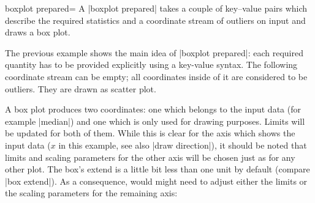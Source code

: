 \begin{plottype}[/pgfplots]{boxplot prepared=\textcolor{black}{\normalfont{}}}
	A |boxplot prepared| takes a couple of key--value pairs which describe the required statistics and a coordinate stream of outliers on input and draws a box plot.

\begin{codeexample}[]
\end{codeexample}
	\noindent The previous example shows the main idea of |boxplot prepared|: each required quantity has to be provided explicitly using a key-value syntax. The following coordinate stream can be empty; all coordinates inside of it are considered to be outliers. They are drawn as scatter plot.

	A box plot produces two coordinates: one which belongs to the input data (for example |median|) and one which is only used for drawing purposes. Limits will be updated for both of them. While this is clear for the axis which shows the input data ($x$ in this example, see also |draw direction|), it should be noted that limits and scaling parameters for the other axis will be chosen just as for any other plot. The box's extend is a little bit less than one unit by default (compare |box extend|). As a consequence, would might need to adjust either the limits or the scaling parameters for the remaining axis:
\begin{codeexample}[]
\end{codeexample}
\end{plottype}

